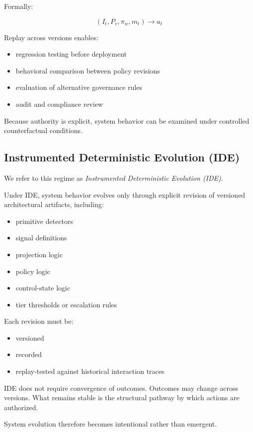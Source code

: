 \documentclass[11pt]{article}
\begin{document}
Formally:

\[
(I_t, P_v, \pi_w, m_t) \rightarrow a_t
\]

Replay across versions enables:

\begin{itemize}
  \item regression testing before deployment
  \item behavioral comparison between policy revisions
  \item evaluation of alternative governance rules
  \item audit and compliance review
\end{itemize}

Because authority is explicit, system behavior can be examined under controlled counterfactual conditions.

\subsection{Instrumented Deterministic Evolution (IDE)}

We refer to this regime as \emph{Instrumented Deterministic Evolution (IDE)}.

Under IDE, system behavior evolves only through explicit revision of versioned architectural artifacts, including:

\begin{itemize}
  \item primitive detectors
  \item signal definitions
  \item projection logic
  \item policy logic
  \item control-state logic
  \item tier thresholds or escalation rules
\end{itemize}

Each revision must be:

\begin{itemize}
  \item versioned
  \item recorded
  \item replay-tested against historical interaction traces
\end{itemize}

IDE does not require convergence of outcomes. Outcomes may change across versions. What remains stable is the structural pathway by which actions are authorized.

System evolution therefore becomes intentional rather than emergent.
\end{document}
